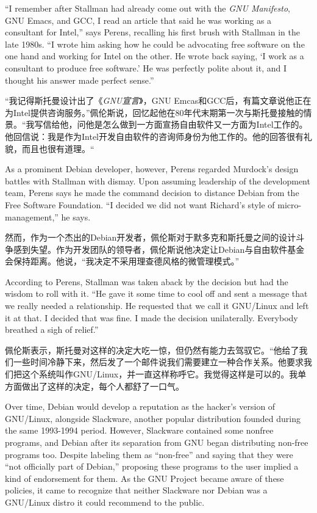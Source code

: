 \ifdefined\eng
``I remember after Stallman had already come out with the \textit{GNU Manifesto}, GNU Emacs, and GCC, I read an article that said he was working as a consultant for Intel,'' says Perens, recalling his first brush with Stallman in the late 1980s. ``I wrote him asking how he could be advocating free software on the one hand and working for Intel on the other. He wrote back saying, `I work as a consultant to produce free software.' He was perfectly polite about it, and I thought his answer made perfect sense.''
\fi

\ifdefined\chs
``我记得斯托曼设计出了《\textit{GNU宣言}》，GNU Emcas和GCC后，有篇文章说他正在为Intel提供咨询服务。''佩伦斯说，回忆起他在80年代末期第一次与斯托曼接触的情景。``我写信给他，问他是怎么做到一方面宣扬自由软件又一方面为Intel工作的。他回信说：我是作为Intel开发自由软件的咨询师身份为他工作的。他的回答很有礼貌，而且也很有道理。``
\fi

\ifdefined\eng
As a prominent Debian developer, however, Perens regarded Murdock's design battles with Stallman with dismay. Upon assuming leadership of the development team, Perens says he made the command decision to distance Debian from the Free Software Foundation. ``I decided we did not want Richard's style of micro-management,'' he says.
\fi

\ifdefined\chs
然而，作为一个杰出的Debian开发者，佩伦斯对于默多克和斯托曼之间的设计斗争感到失望。作为开发团队的领导者，佩伦斯说他决定让Debian与自由软件基金会保持距离。他说，``我决定不采用理查德风格的微管理模式。''
\fi

\ifdefined\eng
According to Perens, Stallman was taken aback by the decision but had the wisdom to roll with it. ``He gave it some time to cool off and sent a message that we really needed a relationship. He requested that we call it GNU/Linux and left it at that. I decided that was fine. I made the decision unilaterally. Everybody breathed a sigh of relief.''
\fi

\ifdefined\chs
佩伦斯表示，斯托曼对这样的决定大吃一惊，但仍然有能力去驾驭它。``他给了我们一些时间冷静下来，然后发了一个邮件说我们需要建立一种合作关系。他要求我们把这个系统叫作GNU/Linux，并一直这样称呼它。我觉得这样是可以的。我单方面做出了这样的决定，每个人都舒了一口气。
\fi

\ifdefined\eng
Over time, Debian would develop a reputation as the hacker's version of GNU/Linux, alongside Slackware, another popular distribution founded during the same 1993-1994 period.  However, Slackware contained some nonfree programs, and Debian after its separation from GNU began distributing non-free programs too.  Despite labeling them as ``non-free'' and saying that they were ``not officially part of Debian,'' proposing these programs to the user implied a kind of endorsement for them.  As the GNU Project became aware of these policies, it came to recognize that neither Slackware nor Debian was a GNU/Linux distro it could recommend to the public.
\fi

